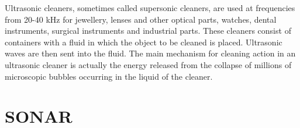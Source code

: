 Ultrasonic cleaners, sometimes called supersonic cleaners, are used at frequencies from 20-40 kHz for jewellery, lenses and other optical parts, watches, dental instruments, surgical instruments and industrial parts.
These cleaners consist of containers with a fluid in which the object to be cleaned is placed. Ultrasonic waves are then sent into the fluid. The main mechanism for cleaning action in an ultrasonic cleaner is actually the energy released from the collapse of millions of microscopic bubbles occurring in the liquid of the cleaner.






\section{SONAR}


